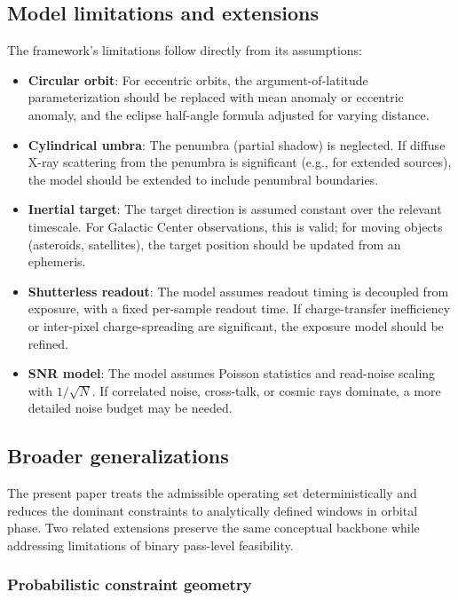 \documentclass[preprint,12pt]{elsarticle}
\theoremstyle{definition}
\theoremstyle{remark}
\begin{document}
\subsection{Model limitations and extensions}

The framework's limitations follow directly from its assumptions:

\begin{itemize}
\item \textbf{Circular orbit}: For eccentric orbits, the argument-of-latitude parameterization should be replaced with mean anomaly or eccentric anomaly, and the eclipse half-angle formula adjusted for varying distance.

\item \textbf{Cylindrical umbra}: The penumbra (partial shadow) is neglected. If diffuse X-ray scattering from the penumbra is significant (e.g., for extended sources), the model should be extended to include penumbral boundaries.

\item \textbf{Inertial target}: The target direction is assumed constant over the relevant timescale. For Galactic Center observations, this is valid; for moving objects (asteroids, satellites), the target position should be updated from an ephemeris.

\item \textbf{Shutterless readout}: The model assumes readout timing is decoupled from exposure, with a fixed per-sample readout time. If charge-transfer inefficiency or inter-pixel charge-spreading are significant, the exposure model should be refined.

\item \textbf{SNR model}: The model assumes Poisson statistics and read-noise scaling with $1/\sqrt{N}$. If correlated noise, cross-talk, or cosmic rays dominate, a more detailed noise budget may be needed.
\end{itemize}

\subsection{Broader generalizations}

The present paper treats the admissible operating set deterministically and reduces the dominant constraints to analytically defined windows in orbital phase.
Two related extensions preserve the same conceptual backbone while addressing limitations of binary pass-level feasibility.

\subsubsection{Probabilistic constraint geometry}
\end{document}
